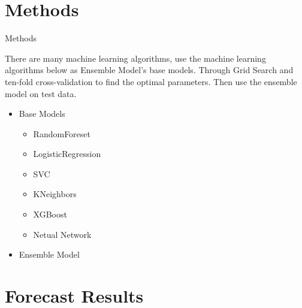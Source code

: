 \documentclass[
 size=14pt,
 paper=smartboard,  %
 mode=present, 		%
 display=slides, 	%
 style=tuliplab,  	%
 pauseslide,
 fleqn,leqno]{powerdot}
\begin{document}

\section{Methods}


\begin{slide}[toc=,bm=]{Methods}

There are many machine learning algorithms, 
use the machine learning algorithms below
as Ensemble Model’s base models. 
Through Grid Search and
ten-fold cross-validation
to find the optimal parameters.
Then use the ensemble model on
test data.

\begin{center}
	\begin{itemize}
		\item Base Models
		\
		\begin{itemize}
			\item RandomForeset
			\item LogisticRegression
			\item SVC
			\item KNeighbors
			\item XGBoost
			\item Netual Network
		\end{itemize}
	    \item Ensemble Model
	\end{itemize}
\end{center}

\end{slide}


\section{Forecast Results}
\end{document}
